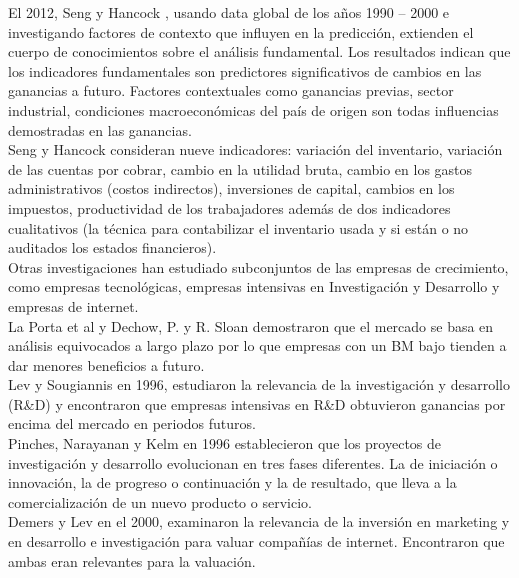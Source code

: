 El 2012, Seng y Hancock \cite{DynaSeng2012}, usando data global de los años 1990 – 2000 e investigando factores de contexto que influyen en la predicción, extienden el cuerpo de conocimientos sobre el análisis fundamental. Los resultados indican que los indicadores fundamentales son predictores significativos de cambios en las ganancias a futuro. Factores contextuales como ganancias previas, sector industrial, condiciones macroeconómicas del país de origen son todas influencias demostradas en las ganancias.\\

Seng y Hancock consideran nueve indicadores: variación del inventario, variación de las cuentas por cobrar, cambio en la utilidad bruta, cambio en los gastos administrativos (costos indirectos), inversiones de capital, cambios en los impuestos, productividad de los trabajadores además de dos indicadores cualitativos (la técnica para contabilizar el inventario usada y si están o no auditados los estados financieros).\\


Otras investigaciones han estudiado subconjuntos de las empresas de crecimiento, como empresas tecnológicas, empresas intensivas en Investigación y Desarrollo y empresas de internet.\\

La Porta et al \cite{Lakonishok1994}  y Dechow, P. y R. Sloan \cite{Dechow1997} demostraron que el mercado se basa en análisis equivocados a largo plazo por lo que empresas con un BM bajo tienden a dar menores beneficios a futuro.\\

Lev y Sougiannis \cite{Lev1996} en 1996, estudiaron la relevancia de la investigación y desarrollo (R\&D) y encontraron que empresas intensivas en R\&D obtuvieron ganancias por encima del mercado en periodos futuros.\\

Pinches, Narayanan y Kelm \cite{Pinches1996} en 1996 establecieron que los proyectos de investigación y desarrollo evolucionan en tres fases diferentes. La de iniciación o innovación, la de progreso o continuación y la de resultado, que lleva a la comercialización de un nuevo producto o servicio.\\

Demers y Lev \cite{Demers2000} en el 2000, examinaron la relevancia de la inversión en marketing y en desarrollo e investigación para valuar compañías de internet. Encontraron que ambas eran relevantes para la valuación.\\

